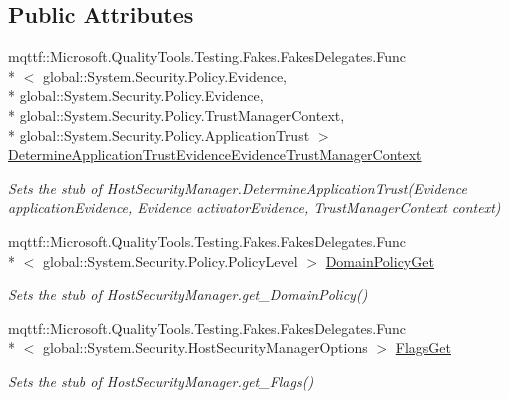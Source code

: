 \subsection*{Public Attributes}
\begin{DoxyCompactItemize}
\item 
mqttf\-::\-Microsoft.\-Quality\-Tools.\-Testing.\-Fakes.\-Fakes\-Delegates.\-Func\\*
$<$ global\-::\-System.\-Security.\-Policy.\-Evidence, \\*
global\-::\-System.\-Security.\-Policy.\-Evidence, \\*
global\-::\-System.\-Security.\-Policy.\-Trust\-Manager\-Context, \\*
global\-::\-System.\-Security.\-Policy.\-Application\-Trust $>$ \hyperlink{class_system_1_1_security_1_1_fakes_1_1_stub_host_security_manager_a1718add9dc02d9df8b1a7dcad6a16930}{Determine\-Application\-Trust\-Evidence\-Evidence\-Trust\-Manager\-Context}
\begin{DoxyCompactList}\small\item\em Sets the stub of Host\-Security\-Manager.\-Determine\-Application\-Trust(\-Evidence application\-Evidence, Evidence activator\-Evidence, Trust\-Manager\-Context context)\end{DoxyCompactList}\item 
mqttf\-::\-Microsoft.\-Quality\-Tools.\-Testing.\-Fakes.\-Fakes\-Delegates.\-Func\\*
$<$ global\-::\-System.\-Security.\-Policy.\-Policy\-Level $>$ \hyperlink{class_system_1_1_security_1_1_fakes_1_1_stub_host_security_manager_a3608d0b2f3e10099368873287d7c522b}{Domain\-Policy\-Get}
\begin{DoxyCompactList}\small\item\em Sets the stub of Host\-Security\-Manager.\-get\-\_\-\-Domain\-Policy()\end{DoxyCompactList}\item 
mqttf\-::\-Microsoft.\-Quality\-Tools.\-Testing.\-Fakes.\-Fakes\-Delegates.\-Func\\*
$<$ global\-::\-System.\-Security.\-Host\-Security\-Manager\-Options $>$ \hyperlink{class_system_1_1_security_1_1_fakes_1_1_stub_host_security_manager_ae95a91bb97c0449204c601b9447e7e72}{Flags\-Get}
\begin{DoxyCompactList}\small\item\em Sets the stub of Host\-Security\-Manager.\-get\-\_\-\-Flags()\end{DoxyCompactList}\item 

\end{DoxyCompactItemize}
